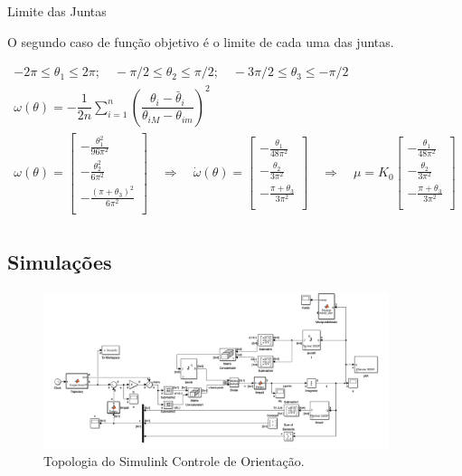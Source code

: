 \documentclass[a4paper,11pt]{article}
\theoremstyle{mytheor}
\begin{document}
\quad \textbullet \quad Limite das Juntas

O segundo caso de função objetivo é o limite de cada uma das juntas.

\begin{gather*}
	-2 \pi \leq \theta_1 \leq 2\pi; \quad -\pi/2 \leq \theta_2 \leq \pi/2; \quad -3\pi/2 \leq \theta_3 \leq -\pi/2 \\
	\omega(\theta) = - \dfrac{1}{2n}\sum_{i=1}^{n} \left( \dfrac{\theta_i - \bar{\theta}_i}{\theta_{iM} - \theta_{im}} \right)^2 \\
	\omega(\theta) = 
	\begin{bmatrix} 
	- \frac{\theta_1^2}{96\pi^2} \\
	- \frac{\theta_2^2}{6\pi^2} \\
	- \frac{(\pi + \theta_3)^2}{6\pi^2} \\
	\end{bmatrix} \quad \Rightarrow \quad 
	\dot{\omega}(\theta) = 
	\begin{bmatrix} 
	- \frac{\theta_1}{48\pi^2} \\
	- \frac{\theta_2}{3\pi^2} \\
	- \frac{\pi + \theta_3}{3\pi^2} \\
	\end{bmatrix} \quad \Rightarrow \quad 
	\mu = K_0\begin{bmatrix} 
	- \frac{\theta_1}{48\pi^2} \\
	- \frac{\theta_2}{3\pi^2} \\
	- \frac{\pi + \theta_3}{3\pi^2} \\
	\end{bmatrix}\\
\end{gather*}

\newpage

\subsection{Simulações}


\begin{figure}[!ht]
\centering
\includegraphics[width=0.9\textwidth]{figs/ex2_1_simulink}
\caption{Topologia do Simulink Controle de Orientação.}
\label{fig:ex2_1_simulink}
\end{figure}
\end{document}
